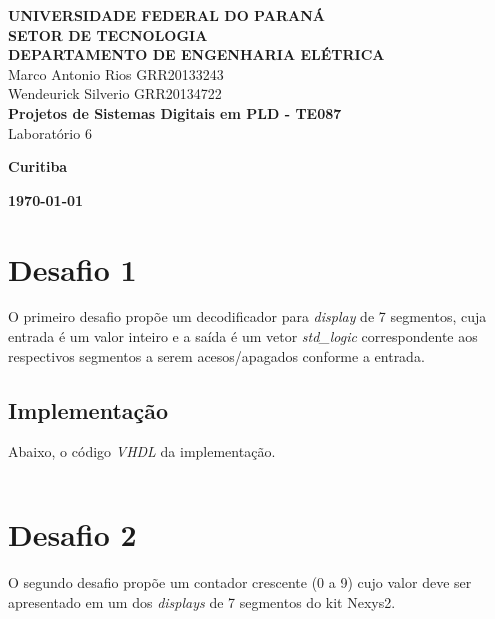 \documentclass[12pt]{article}
\begin{document}
    
\begin{titlepage}
 \vfill
  \begin{center}
   {\large \textbf{UNIVERSIDADE FEDERAL DO PARANÁ \\ SETOR DE TECNOLOGIA \\ DEPARTAMENTO DE ENGENHARIA ELÉTRICA}} \\[5cm]

  {\large {Marco Antonio Rios  GRR20133243 \\ Wendeurick Silverio GRR20134722} }\\[4cm]


   {\Large \textbf{Projetos de Sistemas Digitais em PLD - TE087} \\ Laboratório 6}\\[6cm]
    \vfill

    \vspace{2cm}

    \large \textbf{Curitiba}

    \large \textbf{\today}

      \end{center}
\end{titlepage}

\clearpage

\section{Desafio 1}
O primeiro desafio propõe um decodificador para \emph{display} de 7 segmentos, cuja entrada é um valor inteiro e a saída é um vetor \emph{std\_logic} correspondente aos respectivos segmentos a serem acesos/apagados conforme a entrada.

\subsection{Implementação}

Abaixo, o código \emph{VHDL} da implementação.

\inputminted{vhdl}{display7seg.vhd}

\clearpage

\section{Desafio 2}

O segundo desafio propõe um contador crescente (0 a 9) cujo valor deve ser apresentado em um dos \emph{displays} de 7 segmentos do kit Nexys2.
\end{document}
